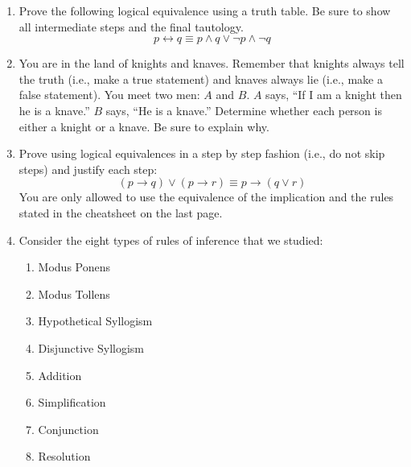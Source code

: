 \documentclass[letterpaper,12pt,fleqn]{article}
\renewcommand{\implies}{\rightarrow}
\renewcommand{\iff}{\leftrightarrow}
\begin{document}
\begin{enumerate}[left=0pt]
\item Prove the following logical equivalence using a truth table.  Be sure to show all intermediate steps and the
  final tautology.
  \[p\iff q\equiv p\land q\lor \lnot p\land\lnot q\]

  \newpage

\item You are in the land of knights and knaves.  Remember that knights always tell the truth (i.e., make a true
  statement) and knaves always lie (i.e., make a false statement).  You meet two men: \(A\) and \(B\).  \(A\) says,
  ``If I am a knight then he is a knave.''  \(B\) says, ``He is a knave.''  Determine whether each person is
  either a knight or a knave.  Be sure to explain why.

  \vspace{3in}

\item Prove using logical equivalences in a step by step fashion (i.e., do not skip steps) and justify each step:
  \[(p\implies q)\lor(p\implies r)\equiv p\implies(q\lor r)\]
  You are only allowed to use the equivalence of the implication and the rules stated in the cheatsheet on the
  last page.

  \newpage

\item Consider the eight types of rules of inference that we studied:
  \begin{enumerate}
  \item Modus Ponens
  \item Modus Tollens
  \item Hypothetical Syllogism
  \item Disjunctive Syllogism
  \item Addition
  \item Simplification
  \item Conjunction
  \item Resolution
  \end{enumerate}

  \vspace{0.5in}


\end{enumerate}
\end{document}
